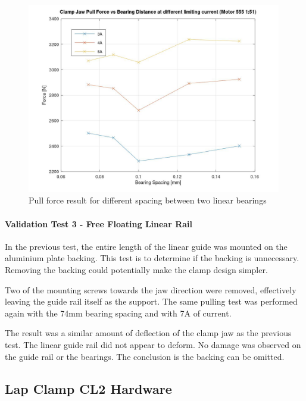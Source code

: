 \begin{figure}[!h]
    \centering
    \includegraphics[width=0.99\textwidth]{images/05/image37.jpg}
    \caption{Pull force result for different spacing between two linear bearings}
    \label{fig:pull-force-result-2}
\end{figure}


\paragraph{Validation Test 3 - Free Floating Linear Rail}

In the previous test, the entire length of the linear guide was mounted on the aluminium plate backing. This test is to determine if the backing is unnecessary. Removing the backing could potentially make the clamp design simpler.

Two of the mounting screws towards the jaw direction were removed, effectively leaving the guide rail itself as the support. The same pulling test was performed again with the 74mm bearing spacing and with 7A of current.

The result was a similar amount of deflection of the clamp jaw as the previous test. The linear guide rail did not appear to deform. No damage was observed on the guide rail or the bearings. The conclusion is the backing can be omitted.

\subsection{Lap Clamp CL2 Hardware}
\label{subsection:exploration-2-lap-clamp-cl2-hardware}

